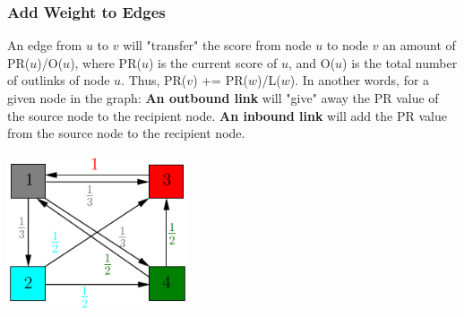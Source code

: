 \documentclass{beamer}
\begin{document}
\begin{frame}
\frametitle{Add Weight to Edges}
        \begin{outline}
            \1 An edge from $u$ to $v$ will "transfer" the score from node $u$ to node $v$ an amount of PR($u$)/O($u$), where PR($u$) is the current score of $u$, and O($u$) is the total number of outlinks of node $u$.  Thus, PR($v$) += PR($w$)/L($w$). 
            \1 In another words, for a given node in the graph:
            \1 \textbf{An outbound link} will "give" away the PR value of the source node to the recipient node.  
            \1 \textbf{An inbound link} will add the PR value from the source node to the recipient node.
        \end{outline}

\begin{center}
    \includegraphics[width= 0.4\textwidth]{weighted.png}
\end{center}
\end{frame}
\end{document}
